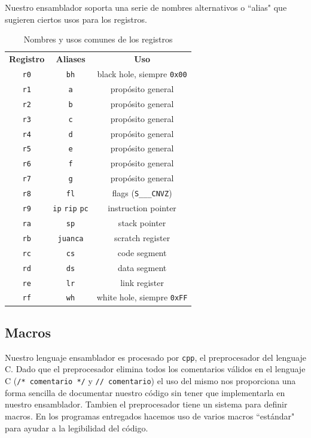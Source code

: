 \documentclass{article}
\begin{document}
Nuestro ensamblador soporta una serie de nombres alternativos o ``alias" que sugieren ciertos usos para los registros.

\begin{table}[h]
    \centering
    \begin{tabular}{c|c|c}
        \textbf{Registro} & \textbf{Aliases} & \textbf{Uso} \\
        \texttt{r0}       & \texttt{bh}      & black hole, siempre \texttt{0x00} \\
        \texttt{r1}       & \texttt{a}       & propósito general \\
        \texttt{r2}       & \texttt{b}       & propósito general \\
        \texttt{r3}       & \texttt{c}       & propósito general \\
        \texttt{r4}       & \texttt{d}       & propósito general \\
        \texttt{r5}       & \texttt{e}       & propósito general \\
        \texttt{r6}       & \texttt{f}       & propósito general \\
        \texttt{r7}       & \texttt{g}       & propósito general \\
        \texttt{r8}       & \texttt{fl}      & flags (\texttt{S\_\_\_CNVZ}) \\
        \texttt{r9}       & \texttt{ip} \texttt{rip} \texttt{pc} 
                                             & instruction pointer \\
        \texttt{ra}       & \texttt{sp}      & stack pointer \\
        \texttt{rb}       & \texttt{juanca}  & scratch register \\
        \texttt{rc}       & \texttt{cs}      & code segment \\
        \texttt{rd}       & \texttt{ds}      & data segment \\
        \texttt{re}       & \texttt{lr}      & link register \\
        \texttt{rf}       & \texttt{wh}      & white hole, siempre \texttt{0xFF} \\
    \end{tabular}
    \caption{Nombres y usos comunes de los registros}
\end{table}

\subsection{Macros}
Nuestro lenguaje ensamblador es procesado por \texttt{cpp}, el preprocesador del lenguaje C. Dado que el preprocesador elimina todos los comentarios válidos en el lenguaje C (\texttt{/* comentario */} y \texttt{// comentario}) el uso del mismo nos proporciona una forma sencilla de documentar nuestro código sin tener que implementarla en nuestro ensamblador. Tambien el preprocesador tiene un sistema para definir macros. En los programas entregados hacemos uso de varios macros ``estándar" para ayudar a la legibilidad del código. 
\end{document}
